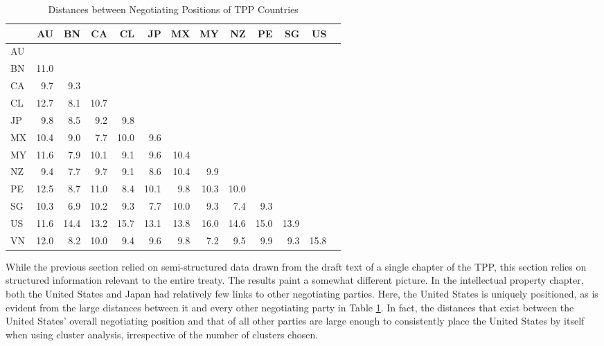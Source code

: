 \documentclass[12pt]{article}
\begin{document}
\begin{table}[ht]
\centering
\caption{Distances between Negotiating Positions of TPP Countries}
\label{tbl_tpp_dist}
\begin{tabular}{lrrrrrrrrrrrr}
  \hline
 & AU & BN & CA & CL & JP & MX & MY & NZ & PE & SG & US \\ 
  \hline
AU &  &  &  &  &  &  &  &  &  &  &  &  \\ 
  BN & 11.0 &  &  &  &  &  &  &  &  &  &  &  \\ 
  CA & 9.7 & 9.3 &  &  &  &  &  &  &  &  &  &  \\ 
  CL & 12.7 & 8.1 & 10.7 &  &  &  &  &  &  &  &  &  \\ 
  JP & 9.8 & 8.5 & 9.2 & 9.8 &  &  &  &  &  &  &  &  \\ 
  MX & 10.4 & 9.0 & 7.7 & 10.0 & 9.6 &  &  &  &  &  &  &  \\ 
  MY & 11.6 & 7.9 & 10.1 & 9.1 & 9.6 & 10.4 &  &  &  &  &  &  \\ 
  NZ & 9.4 & 7.7 & 9.7 & 9.1 & 8.6 & 10.4 & 9.9 &  &  &  &  &  \\ 
  PE & 12.5 & 8.7 & 11.0 & 8.4 & 10.1 & 9.8 & 10.3 & 10.0 &  &  &  &  \\ 
  SG & 10.3 & 6.9 & 10.2 & 9.3 & 7.7 & 10.0 & 9.3 & 7.4 & 9.3 &  &  &  \\ 
  US & 11.6 & 14.4 & 13.2 & 15.7 & 13.1 & 13.8 & 16.0 & 14.6 & 15.0 & 13.9 &  &  \\ 
  VN & 12.0 & 8.2 & 10.0 & 9.4 & 9.6 & 9.8 & 7.2 & 9.5 & 9.9 & 9.3 & 15.8 &  \\ 
\hline
\end{tabular}
\end{table}

While the previous section relied on semi-structured data 
drawn from the draft text of a single chapter of the TPP, this section relies on structured information 
relevant to the entire treaty. The results paint a somewhat different picture. In the intellectual 
property chapter, both the United States and Japan had relatively few links to other negotiating 
parties. Here, the United States is uniquely positioned, as is evident from the large distances 
between it and every other negotiating party in Table \ref{tbl_tpp_dist}. 
In fact, the distances that exist between the United States' overall negotiating position 
and that of all other parties are large enough to consistently place the United States by itself when 
using cluster analysis, irrespective of the number of clusters chosen.
\end{document}
